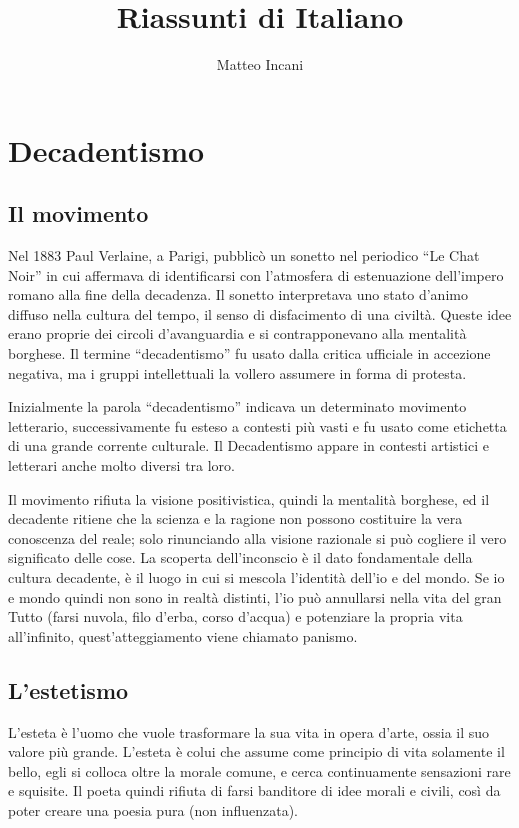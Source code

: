 \documentclass[10pt]{report}
\begin{document}
	
	\title{Riassunti di Italiano}
	\author{Matteo Incani}	
	\maketitle
	\twocolumn
	\chapter*{Decadentismo}
	
		\section{Il movimento}
		
	Nel 1883 Paul Verlaine, a Parigi, pubblicò un sonetto nel periodico “Le Chat Noir” in cui affermava di identificarsi con l’atmosfera di estenuazione dell’impero romano alla fine della decadenza.
	 Il sonetto interpretava uno stato d’animo diffuso nella cultura del tempo, il senso di disfacimento di una civiltà. Queste idee erano proprie dei circoli d’avanguardia e si contrapponevano alla mentalità borghese.
	  Il termine “decadentismo” fu usato dalla critica ufficiale in accezione negativa, ma i gruppi intellettuali la vollero assumere in forma di protesta. 
	  
	Inizialmente la parola “decadentismo” indicava un determinato movimento letterario, successivamente fu esteso a contesti più vasti e fu usato come etichetta di una grande corrente culturale. Il Decadentismo appare in contesti artistici e letterari anche molto diversi tra loro.
	
	Il movimento rifiuta la visione positivistica, quindi la mentalità borghese, ed il decadente ritiene che la scienza e la ragione non possono costituire la vera conoscenza del reale; solo rinunciando alla visione razionale si può cogliere il vero significato delle cose.
	 La scoperta dell’inconscio è il dato fondamentale della cultura decadente, è il luogo in cui si mescola l’identità dell’io e del mondo. Se io e mondo quindi non sono in realtà distinti, l’io può annullarsi nella vita del gran Tutto (farsi nuvola, filo d’erba, corso d’acqua) e potenziare la propria vita all’infinito, quest’atteggiamento viene chiamato panismo.
	 
	 \section[Estetismo]{L'estetismo}

	 L’esteta è l’uomo che vuole trasformare la sua vita in opera d’arte, ossia il suo valore più grande.
	  L’esteta è colui che assume come principio di vita solamente il bello, egli si colloca oltre la morale comune, e cerca continuamente sensazioni rare e squisite.
	   Il poeta quindi rifiuta di farsi banditore di idee morali e civili, così da poter creare una poesia pura (non influenzata).
		
\end{document}
